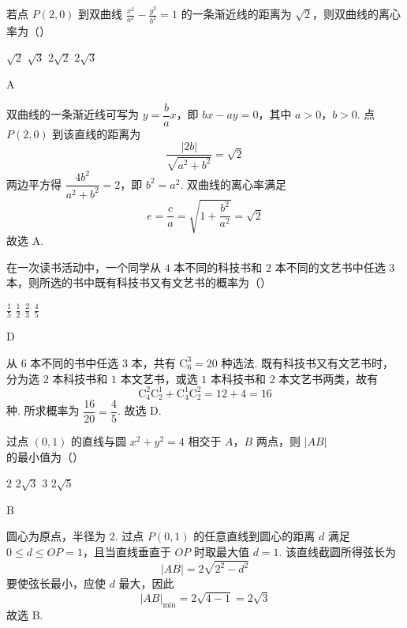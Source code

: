 \begin{problem}
若点 \(P(2,0)\) 到双曲线 \( \frac{x^{2}}{a^{2}} - \frac{y^{2}}{b^{2}} = 1 \) 的一条渐近线的距离为 \( \sqrt{2} \)，则双曲线的离心率为（\quad）

\choices
    {\( \sqrt{2} \)}
    {\( \sqrt{3} \)}
    {\( 2\sqrt{2} \)}
    {\( 2\sqrt{3} \)}
\end{problem}

\begin{answer}
A
\end{answer}

\begin{solution}
双曲线的一条渐近线可写为 \(y=\dfrac{b}{a}x\)，即 \(bx-ay=0\)，其中 \(a>0\)，\(b>0\). 点 \(P(2,0)\) 到该直线的距离为
\[
\frac{|2b|}{\sqrt{a^2+b^2}}=\sqrt2
\]
两边平方得 \(\dfrac{4b^2}{a^2+b^2}=2\)，即 \(b^2=a^2\). 双曲线的离心率满足
\[
e=\frac{c}{a}=\sqrt{1+\frac{b^2}{a^2}}=\sqrt2
\]
故选 A.
\end{solution}

\begin{problem}
在一次读书活动中，一个同学从 \(4\) 本不同的科技书和 \(2\) 本不同的文艺书中任选 \(3\) 本，则所选的书中既有科技书又有文艺书的概率为（\quad）

\choices
    {\( \frac{1}{5} \)}
    {\( \frac{1}{2} \)}
    {\( \frac{2}{3} \)}
    {\( \frac{4}{5} \)}
\end{problem}

\begin{answer}
D
\end{answer}

\begin{solution}
从 \(6\) 本不同的书中任选 \(3\) 本，共有 \(\mathrm C_6^3=20\) 种选法. 既有科技书又有文艺书时，分为选 \(2\) 本科技书和 \(1\) 本文艺书，或选 \(1\) 本科技书和 \(2\) 本文艺书两类，故有
\[
\mathrm C_4^2\mathrm C_2^1+\mathrm C_4^1\mathrm C_2^2=12+4=16
\]
种. 所求概率为 \(\dfrac{16}{20}=\dfrac45\). 故选 D.
\end{solution}

\begin{problem}
过点 \((0,1)\) 的直线与圆 \(x^{2} + y^{2} = 4\) 相交于 \(A\)，\(B\) 两点，则 \(|AB|\) 的最小值为（\quad）

\choices
    {\(2\)}
    {\(2\sqrt{3}\)}
    {\(3\)}
    {\(2\sqrt{5}\)}
\end{problem}

\begin{answer}
B
\end{answer}

\begin{solution}
圆心为原点，半径为 \(2\). 过点 \(P(0,1)\) 的任意直线到圆心的距离 \(d\) 满足 \(0\leq d\leq OP=1\)，且当直线垂直于 \(OP\) 时取最大值 \(d=1\). 该直线截圆所得弦长为
\[
|AB|=2\sqrt{2^2-d^2}
\]
要使弦长最小，应使 \(d\) 最大，因此
\[
|AB|_{\min}=2\sqrt{4-1}=2\sqrt3
\]
故选 B.
\end{solution}

